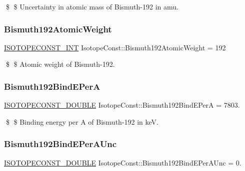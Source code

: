 \$ \$ Uncertainty in atomic mass of Bismuth-\/192 in amu. \mbox{\label{group___isotope_const-_bismuth-_bi192_ga826a1d76b88c422c8ec646736fc191af}} 
\subsubsection{\texorpdfstring{Bismuth192\+Atomic\+Weight}{Bismuth192AtomicWeight}}
{\footnotesize\ttfamily \mbox{\hyperlink{group___isotope_const-_macros_ga5f18360b3e99483a35c32d789e62621c}{I\+S\+O\+T\+O\+P\+E\+C\+O\+N\+S\+T\+\_\+\+I\+NT}} Isotope\+Const\+::\+Bismuth192\+Atomic\+Weight = 192}

\$ \$ Atomic weight of Bismuth-\/192. \mbox{\label{group___isotope_const-_bismuth-_bi192_gaf3312105a41ae47b06c1866145d52aa2}} 
\subsubsection{\texorpdfstring{Bismuth192\+Bind\+E\+PerA}{Bismuth192BindEPerA}}
{\footnotesize\ttfamily \mbox{\hyperlink{group___isotope_const-_macros_ga8f45a7272ce02c0b4c65c44636ed719a}{I\+S\+O\+T\+O\+P\+E\+C\+O\+N\+S\+T\+\_\+\+D\+O\+U\+B\+LE}} Isotope\+Const\+::\+Bismuth192\+Bind\+E\+PerA = 7803.}

\$ \$ Binding energy per A of Bismuth-\/192 in keV. \mbox{\label{group___isotope_const-_bismuth-_bi192_gad6c7b7ec1c56e00a0331706ac4cfe8dd}} 
\subsubsection{\texorpdfstring{Bismuth192\+Bind\+E\+Per\+A\+Unc}{Bismuth192BindEPerAUnc}}
{\footnotesize\ttfamily \mbox{\hyperlink{group___isotope_const-_macros_ga8f45a7272ce02c0b4c65c44636ed719a}{I\+S\+O\+T\+O\+P\+E\+C\+O\+N\+S\+T\+\_\+\+D\+O\+U\+B\+LE}} Isotope\+Const\+::\+Bismuth192\+Bind\+E\+Per\+A\+Unc = 0.}

